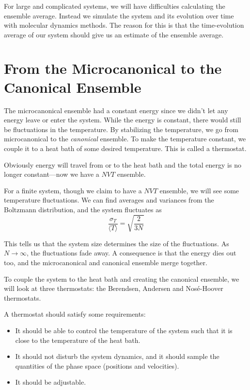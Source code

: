 \documentclass[12pt]{article}
\numberwithin{equation}{section}
\numberwithin{figure}{section}
\newcommand{\ita}[1]{\textit{#1}}
\begin{document}
For large and complicated systems, we will have difficulties
calculating the ensemble average.
Instead we simulate the system and its evolution over time
with molecular dynamics methods.
The reason for this is that the time-evolution average of our
system should give us an estimate of the ensemble average.

\section{From the Microcanonical to the Canonical Ensemble}
The microcanonical ensemble had a constant energy since we didn't
let any energy leave or enter the system.
While the energy is constant, there would still be fluctuations
in the temperature. By stabilizing the temperature, we go
from microcanonical to the \ita{canonical} ensemble.
To make the temperature constant, we couple it to a 
heat bath of some desired temperature.
This is called a thermostat.


Obviously energy will travel from or to the heat bath and
the total energy is no longer constant---now we have
a $NVT$ ensemble.

For a finite system, though we claim to have a $NVT$ ensemble,
we will see some temperature fluctuations.
We can find averages and variances from the Boltzmann distribution,
and the system fluctuates as
\begin{equation}
    \frac{\sigma_T}{\langle T \rangle} = \sqrt{\frac{2}{3N}}
\end{equation}

This tells us that the system size determines the size of the fluctuations.
As $N\rightarrow \infty$, the fluctuations fade away.
A consequence is that the energy dies out too,
and the microcanonical and canonical ensemble merge together.

To couple the system to the heat bath and creating the canonical ensemble,
we will look at three thermostats: the Berendsen, Andersen and Nosé-Hoover
thermostats.

A thermostat should satisfy some requirements:
\begin{itemize}
    \item It should be able to control the temperature of the system
        such that it is close to the temperature of the heat bath.
    \item It should not disturb the system dynamics, and it should
        sample the quantities of the phase space (positions and velocities).
    \item It should be adjustable.
    \end{itemize}
\end{document}
